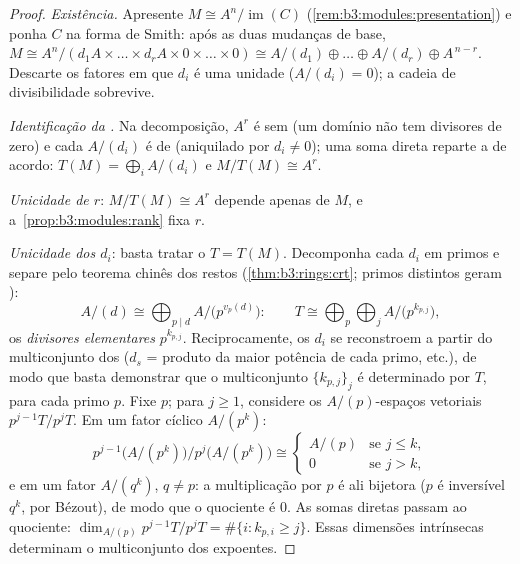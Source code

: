 \begin{proof}
\emph{Existência.} Apresente $M \cong A^n/\operatorname{im}(C)$ (\cref{rem:b3:modules:presentation}) e ponha $C$ na
forma de Smith: após as duas mudanças de base, $M \cong A^n / (d_1A \times \dots
\times d_rA \times 0 \times \dots \times 0) \cong A/(d_1) \oplus
\dots \oplus A/(d_r) \oplus A^{\,n - r}$. Descarte os
fatores em que $d_i$ é uma unidade ($A/(d_i) = 0$); a cadeia de
divisibilidade sobrevive.

\emph{Identificação da .} Na decomposição, $A^r$ é sem 
(um domínio não tem divisores de zero) e cada $A/(d_i)$ é de 
(aniquilado por $d_i \ne 0$); uma soma direta reparte a  de acordo:
$T(M) = \bigoplus_i A/(d_i)$ e $M/T(M) \cong A^r$.

\emph{Unicidade de $r$}: $M/T(M) \cong A^r$ depende apenas de $M$, e
a~\cref{prop:b3:modules:rank} fixa $r$.

\emph{Unicidade dos $d_i$}: basta tratar o  $T = T(M)$.
Decomponha cada $d_i$ em primos e separe pelo teorema chinês dos
restos (\cref{thm:b3:rings:crt}; primos distintos geram ):
\[
A/(d) \cong \bigoplus_{p \mid d} A/\bigl(p^{v_p(d)}\bigr):
\qquad
T \cong \bigoplus_{p} \bigoplus_{j} A/\bigl(p^{k_{p,j}}\bigr),
\]
os \emph{divisores elementares} $p^{k_{p,j}}$.
Reciprocamente, os $d_i$ se reconstroem a partir do multiconjunto
dos  ($d_s$ = produto da maior potência de
cada primo, etc.), de modo que basta demonstrar que o multiconjunto
$\{k_{p,j}\}_j$ é determinado por $T$, para cada primo $p$. Fixe $p$;
para $j \geq 1$, considere os $A/(p)$-espaços vetoriais $p^{j-1}T/p^jT$. Em um
fator cíclico $A/(p^k)$:
\[
p^{j-1}\bigl(A/(p^k)\bigr)\big/p^{j}\bigl(A/(p^k)\bigr)
\cong
\begin{cases}
A/(p) & \text{se } j \leq k,\\
0 & \text{se } j > k,
\end{cases}
\]
e em um fator $A/(q^k)$, $q \neq p$: a multiplicação por $p$ é ali bijetora
($p$ é inversível  $q^k$, por Bézout), de modo que o
quociente é $0$. As somas diretas passam ao quociente: $\dim_{A/(p)}
p^{j-1}T/p^jT = \#\{i : k_{p,i} \geq j\}$. Essas
dimensões intrínsecas determinam o multiconjunto dos expoentes.
\end{proof}

